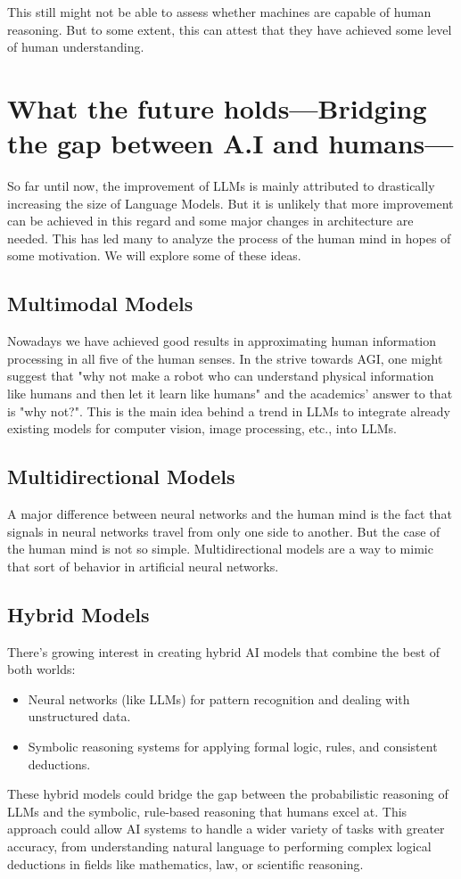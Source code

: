 This still might not be able to assess whether machines are capable of human reasoning. But to some extent, this can attest that they have achieved some level of human understanding.


\section*{What the future holds—Bridging the gap between A.I and humans—}

So far until now, the improvement of LLMs is mainly attributed to drastically increasing the size of Language Models. But it is unlikely that more improvement can be achieved in this regard and some major changes in architecture are needed. This has led many to analyze the process of the human mind in hopes of some motivation. We will explore some of these ideas.

\subsection*{Multimodal Models}
Nowadays we have achieved good results in approximating human information processing in all five of the human senses. In the strive towards AGI, one might suggest that "why not make a robot who can understand physical information like humans and then let it learn like humans" and the academics' answer to that is "why not?". This is the main idea behind a trend in LLMs to integrate already existing models for computer vision, image processing, etc., into LLMs.

\subsection*{Multidirectional Models}
A major difference between neural networks and the human mind is the fact that signals in neural networks travel from only one side to another. But the case of the human mind is not so simple. Multidirectional models are a way to mimic that sort of behavior in artificial neural networks.

\subsection*{Hybrid Models}
There’s growing interest in creating hybrid AI models that combine the best of both worlds:
\begin{itemize}
    \item Neural networks (like LLMs) for pattern recognition and dealing with unstructured data.
    \item Symbolic reasoning systems for applying formal logic, rules, and consistent deductions.
\end{itemize}
These hybrid models could bridge the gap between the probabilistic reasoning of LLMs and the symbolic, rule-based reasoning that humans excel at. This approach could allow AI systems to handle a wider variety of tasks with greater accuracy, from understanding natural language to performing complex logical deductions in fields like mathematics, law, or scientific reasoning.


